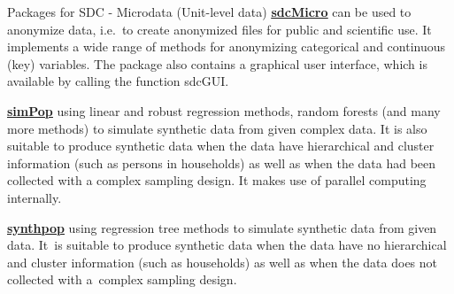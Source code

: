 \documentclass[
	11pt, %
]{beamer}
\begin{document}
\begin{frame}{Packages for SDC - Microdata (Unit-level data)}
\label{packages-for-sdc---microdata-unit-level-data}
\href{https://cran.r-project.org/web/packages/sdcMicro/index.html}{\color{blue}\underline{\textbf{sdcMicro}}}
can be used to anonymize data, i.e.~to create anonymized files for
public and scientific use. It implements a wide range of methods for
anonymizing categorical and continuous (key) variables. The package also
contains a graphical user interface, which is available by calling the
function sdcGUI.

\href{https://cran.r-project.org/web/packages/simPop/index.html}{\color{blue}\underline{\textbf{simPop}}}
using linear and robust regression methods, random forests (and many
more methods) to simulate synthetic data from given complex data. It is
also suitable to produce synthetic data when the data have hierarchical
and cluster information (such as persons in households) as well as when
the data had been collected with a complex sampling design. It makes use
of parallel computing internally.

\href{https://cran.r-project.org/web/packages/synthpop/index.html}{\color{blue}\underline{\textbf{synthpop}}}
using regression tree methods to simulate synthetic data from given
data. It~is suitable to produce synthetic data when the data have no
hierarchical and cluster information (such as households) as well as
when the data does not collected with a~complex sampling design.
\end{frame}
\end{document}
